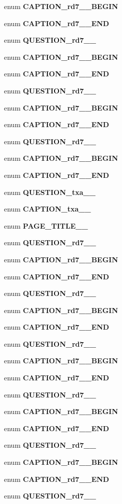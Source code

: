 \begin{CompactItemize}
enum {\bf CAPTION\_\-rd7\_\_\-BEGIN} 
\item 
enum {\bf CAPTION\_\-rd7\_\_\-END} 
\item 
enum {\bf QUESTION\_\-rd7\_\_\-} 
\item 
enum {\bf CAPTION\_\-rd7\_\_\-BEGIN} 
\item 
enum {\bf CAPTION\_\-rd7\_\_\-END} 
\item 
enum {\bf QUESTION\_\-rd7\_\_\-} 
\item 
enum {\bf CAPTION\_\-rd7\_\_\-BEGIN} 
\item 
enum {\bf CAPTION\_\-rd7\_\_\-END} 
\item 
enum {\bf QUESTION\_\-rd7\_\_\-} 
\item 
enum {\bf CAPTION\_\-rd7\_\_\-BEGIN} 
\item 
enum {\bf CAPTION\_\-rd7\_\_\-END} 
\item 
enum {\bf QUESTION\_\-txa\_\_\-} 
\item 
enum {\bf CAPTION\_\-txa\_\_\-} 
\item 
enum {\bf PAGE\_\-TITLE\_\_\-} 
\item 
enum {\bf QUESTION\_\-rd7\_\_\-} 
\item 
enum {\bf CAPTION\_\-rd7\_\_\-BEGIN} 
\item 
enum {\bf CAPTION\_\-rd7\_\_\-END} 
\item 
enum {\bf QUESTION\_\-rd7\_\_\-} 
\item 
enum {\bf CAPTION\_\-rd7\_\_\-BEGIN} 
\item 
enum {\bf CAPTION\_\-rd7\_\_\-END} 
\item 
enum {\bf QUESTION\_\-rd7\_\_\-} 
\item 
enum {\bf CAPTION\_\-rd7\_\_\-BEGIN} 
\item 
enum {\bf CAPTION\_\-rd7\_\_\-END} 
\item 
enum {\bf QUESTION\_\-rd7\_\_\-} 
\item 
enum {\bf CAPTION\_\-rd7\_\_\-BEGIN} 
\item 
enum {\bf CAPTION\_\-rd7\_\_\-END} 
\item 
enum {\bf QUESTION\_\-rd7\_\_\-} 
\item 
enum {\bf CAPTION\_\-rd7\_\_\-BEGIN} 
\item 
enum {\bf CAPTION\_\-rd7\_\_\-END} 
\item 
enum {\bf QUESTION\_\-rd7\_\_\-} 
\item 

\end{CompactItemize}
